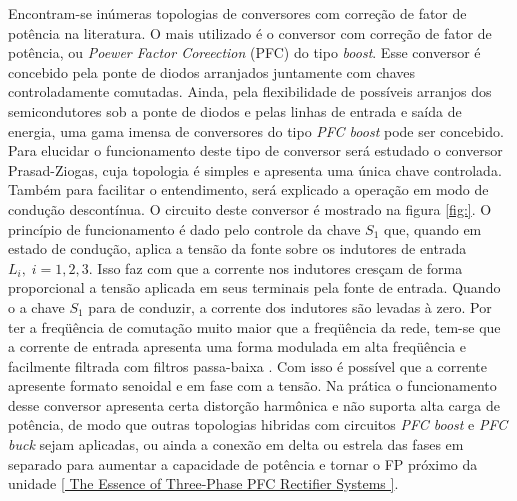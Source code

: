 Encontram-se inúmeras topologias de conversores com correção de fator de potência na literatura. O mais utilizado é o conversor com correção de fator de potência, ou \textit{Poewer Factor Coreection} (PFC) do tipo \textit{boost}. Esse conversor é concebido pela ponte de diodos arranjados juntamente com chaves controladamente comutadas. Ainda, pela flexibilidade de possíveis arranjos dos semicondutores sob a ponte de diodos e pelas linhas de entrada e saída de energia, uma gama imensa de conversores do tipo \textit{PFC boost} pode ser concebido. Para elucidar o funcionamento deste tipo de conversor será estudado o conversor Prasad-Ziogas, cuja topologia é simples e apresenta uma única chave controlada. Também para facilitar o entendimento, será explicado a operação em modo de condução descontínua. O circuito deste conversor é mostrado na figura \ref{fig:}. O princípio de funcionamento é dado pelo controle da chave $S_1$ que, quando em estado de condução, aplica a tensão da fonte sobre os indutores de entrada $L_i,\;i=1,2,3$. Isso faz com que a corrente nos indutores cresçam de forma proporcional a tensão aplicada em seus terminais pela fonte de entrada. Quando o a chave $S_1$ para de conduzir, a corrente dos indutores são levadas à zero. Por ter a freqüência de comutação muito maior que a freqüência da rede, tem-se que a corrente de entrada apresenta uma forma modulada em alta freqüência e facilmente filtrada com filtros passa-baixa \cite{three phase active boost active power factor correction for diodes rectifiers, A Novel PFC Circuit for Three-phase utilizing Single Switching Device}. Com isso é possível que a corrente apresente formato senoidal e em fase com a tensão. Na prática o funcionamento desse conversor apresenta certa distorção harmônica e não suporta alta carga de potência, de modo que outras topologias hibridas com circuitos \textit{PFC boost} e \textit{PFC buck} sejam aplicadas, ou ainda a conexão em delta ou estrela das fases em separado para aumentar a capacidade de potência e tornar o FP próximo da unidade \ref{ The Essence of Three-Phase PFC Rectifier Systems }.
